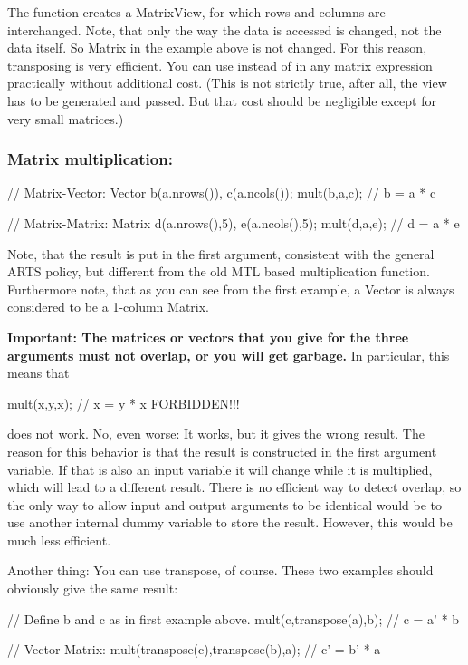 The function  creates a MatrixView, for which rows and
columns are interchanged. Note, that only the way the data is accessed
is changed, not the data itself. So Matrix  in the example
above is not changed. For this reason, transposing is very efficient.
You can use  instead of  in any matrix
expression practically without additional cost. (This is not strictly
true, after all, the view has to be generated and passed. But that
cost should be negligible except for very small matrices.)

\subsubsection{Matrix multiplication:}
\begin{code}
// Matrix-Vector:
Vector b(a.nrows()), c(a.ncols());
mult(b,a,c);                           // b = a * c

// Matrix-Matrix:
Matrix d(a.nrows(),5), e(a.ncols(),5);
mult(d,a,e);                           // d = a * e
\end{code}

Note, that the result is put in the first argument, consistent with
the general ARTS policy, but different from the old MTL based
multiplication function. Furthermore note, that as you can see from
the first example, a Vector is always considered to be a 1-column
Matrix.

\textbf{Important: The matrices or vectors that you give for the three
arguments must not overlap, or you will get garbage.} In particular,
this means that
\begin{code}
mult(x,y,x);            // x = y * x FORBIDDEN!!!
\end{code}
does not work. No, even worse: It works, but it gives the wrong
result.  The reason for this behavior is that the result is
constructed in the first argument variable. If that is also an input
variable it will change while it is multiplied, which will lead to a
different result.  There is no efficient way to detect overlap, so the
only way to allow input and output arguments to be identical would be
to use another internal dummy variable to store the result. However,
this would be much less efficient.

Another thing: You can use transpose, of course. These two examples
should obviously give the same result:

\begin{code}
// Define b and c as in first example above.
mult(c,transpose(a),b);                      // c = a' * b

// Vector-Matrix:
mult(transpose(c),transpose(b),a);           // c' = b' * a
\end{code}


